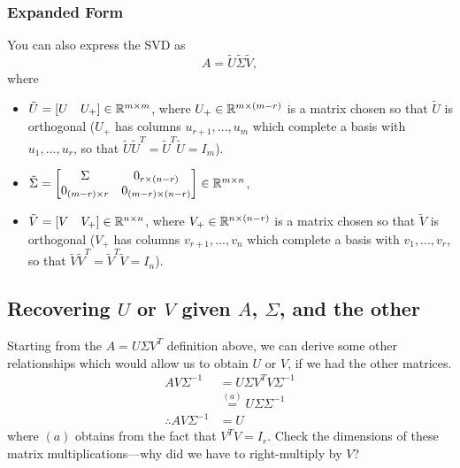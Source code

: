 \documentclass[12pt]{article}
\begin{document}
\subsubsection{Expanded Form}
You can also express the SVD as
%
\begin{equation}
A = \tilde{U} \tilde{\Sigma} \tilde{V},
\end{equation}
%
where 
%
\begin{itemize}
\item $\tilde{U} = [\begin{matrix} U & U_+ \end{matrix}] \in { {\mathbb R}^{m \times m} }$, where $U_+ \in { {\mathbb R}^{m \times (m - r)} }$ is a matrix chosen so that $\tilde{U}$ is orthogonal ($U_+$ has columns $u_{r+1}, ..., u_m$ which complete a basis with $u_1, ..., u_r$, so that $\tilde{U} \tilde{U}^T = \tilde{U}^T \tilde{U} = I_m$). 
\item $\tilde{\Sigma} = \left[\begin{matrix}\Sigma & 0_{r \times (n-r)} \\ 0_{(m-r)\times r} & 0_{(m-r)\times(n-r)} \end{matrix}\right] \in { {\mathbb R}^{m \times n} }$,
\item $\tilde{V} = [\begin{matrix} V & V_+ \end{matrix}] \in { {\mathbb R}^{n \times n} }$, where $V_+ \in { {\mathbb R}^{n \times (n - r)} }$ is a matrix chosen so that $\tilde{V}$ is orthogonal ($V_+$ has columns $v_{r+1}, ..., v_n$ which complete a basis with $v_1, ..., v_r$, so that $\tilde{V}\tilde{V}^T = \tilde{V}^T \tilde{V} = I_n$).
\end{itemize}

\subsection{Recovering $U$ or $V$ given $A$, $\Sigma$, and the other}

Starting from the $A = U \Sigma V^T$ definition above, we can derive some other relationships which would allow us to obtain $U$ or $V$, if we had the other matrices.
%
\begin{align*}
AV\Sigma^{-1} &= U \Sigma V^T V \Sigma^{-1} \\
&\overset{(a)}{=} U \Sigma \Sigma^{-1} \\
\therefore AV\Sigma^{-1} &= U
\end{align*}
%
where $(a)$ obtains from the fact that $V^T V = I_r$. Check the dimensions of these matrix multiplications---why did we have to right-multiply by $V$? 
\end{document}
